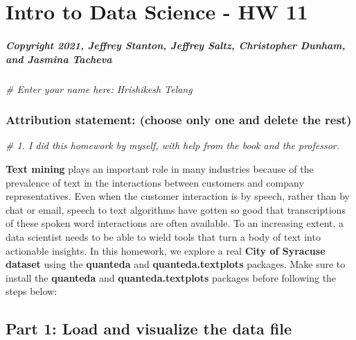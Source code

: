 \documentclass[
]{article}
\author{}
\date{\vspace{-2.5em}}
\newenvironment{Shaded}{\begin{snugshade}}{\end{snugshade}}
\newcommand{\CommentTok}[1]{\textcolor[rgb]{0.56,0.35,0.01}{\textit{#1}}}
\begin{document}
\hypertarget{intro-to-data-science---hw-11}{%
\section{Intro to Data Science - HW
11}\label{intro-to-data-science---hw-11}}

\hypertarget{copyright-2021-jeffrey-stanton-jeffrey-saltz-christopher-dunham-and-jasmina-tacheva}{%
\subparagraph{Copyright 2021, Jeffrey Stanton, Jeffrey Saltz,
Christopher Dunham, and Jasmina
Tacheva}\label{copyright-2021-jeffrey-stanton-jeffrey-saltz-christopher-dunham-and-jasmina-tacheva}}

\begin{Shaded}
\begin{Highlighting}[]
\CommentTok{\# Enter your name here: Hrishikesh Telang}
\end{Highlighting}
\end{Shaded}

\hypertarget{attribution-statement-choose-only-one-and-delete-the-rest}{%
\subsubsection{Attribution statement: (choose only one and delete the
rest)}\label{attribution-statement-choose-only-one-and-delete-the-rest}}

\begin{Shaded}
\begin{Highlighting}[]
\CommentTok{\# 1. I did this homework by myself, with help from the book and the professor.}
\end{Highlighting}
\end{Shaded}

\textbf{Text mining} plays an important role in many industries because
of the prevalence of text in the interactions between customers and
company representatives. Even when the customer interaction is by
speech, rather than by chat or email, speech to text algorithms have
gotten so good that transcriptions of these spoken word interactions are
often available. To an increasing extent, a data scientist needs to be
able to wield tools that turn a body of text into actionable insights.
In this homework, we explore a real \textbf{City of Syracuse dataset}
using the \textbf{quanteda} and \textbf{quanteda.textplots} packages.
Make sure to install the \textbf{quanteda} and
\textbf{quanteda.textplots} packages before following the steps below:

\hypertarget{part-1-load-and-visualize-the-data-file}{%
\subsection{Part 1: Load and visualize the data
file}\label{part-1-load-and-visualize-the-data-file}}
\end{document}
